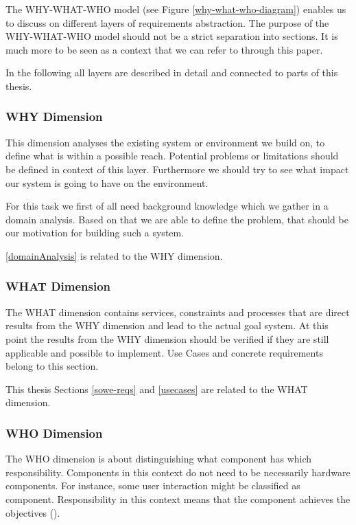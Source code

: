 The WHY-WHAT-WHO model (see Figure \ref{why-what-who-diagram}) enables us to discuss on different layers of requirements abstraction. The purpose of the WHY-WHAT-WHO model should not be a strict separation into sections. It is much more to be seen as a context that we can refer to through this paper.

In the following all layers are described in detail and connected to parts of this thesis. 

\subsubsection{WHY Dimension}
This dimension analyses the existing system or environment 
we build on, to define what is within a possible reach. Potential problems or limitations should be defined in context of this layer. Furthermore we should try to see what impact our system is going to have on the environment. 

For this task we first of all need background knowledge which we gather in a domain analysis. Based on that we are able to define the problem, that should be our motivation for building such a system. 

 \ref{domainAnalysis} is related to the WHY dimension.

\subsubsection{WHAT Dimension}

The WHAT dimension contains services, constraints and processes that are direct results from the WHY dimension and lead to the actual goal system. At this point the results from the WHY dimension should be verified if they are still applicable and possible to implement. Use Cases and concrete requirements belong to this section. 

This thesis Sections \ref{sowe-reqs}  and \ref{usecases}  are related to the WHAT dimension.

\subsubsection{WHO Dimension}

The WHO dimension is about distinguishing what component has which responsibility. Components in this context do
 not
 need to be necessarily hardware components. For instance, some user interaction might be classified as component. Responsibility in this context means that the component achieves the objectives (\cite{van2009requirements}).

